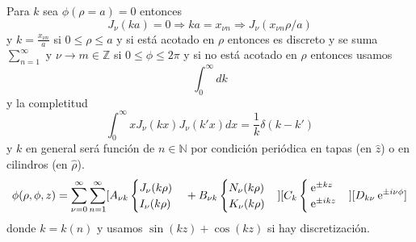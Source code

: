 \documentclass[10pt,oneside]{CBFT_book}
\begin{document}
Para $k$ sea $\phi(\rho=a)=0$ entonces 
\[
	J_\nu(ka) = 0 \Rightarrow ka=x_{\nu n} \Rightarrow J_\nu (x_{\nu n} \rho/a)
\]
y $k=\frac{x_{\nu n}}{a}$ si $0\leq \rho \leq a$ y si está acotado en $\rho$ entonces es discreto y se
suma $\sum_{n=1}^\infty$ y $\nu\to m \in \mathbb{Z}$ si $0 \leq \phi \leq 2\pi$ y si no está acotado en
$\rho$ entonces usamos 
\[
	\int_0^\infty dk
\]
y la completitud
\[
	\int_0^\infty x J_\nu(kx) J_\nu(k'x) dx = \frac{1}{k} \delta (k-k')
\]
y $k$ en general será función de $n\in \mathbb{N}$ por condición periódica en tapas (en $\hat{z}$) o en
cilindros (en $\hat{\rho}$).
\[
	\phi(\rho,\phi,z) = \sum_{\nu=0}^\infty \sum_{n=1}^\infty
	[A_{\nu k}\begin{cases} J_\nu(k\rho)  \\ I_\nu(k\rho) \end{cases} + 
	B_{\nu k} \begin{cases} N_\nu(k\rho)  \\ K_\nu(k\rho) \end{cases} ]
	[C_k \begin{cases} \:\mathrm{e}^{\pm kz} \\ \:\mathrm{e}^{\pm ikz} \end{cases}]
	[D_{k\nu} \:\mathrm{e}^{\pm i \nu \phi}]
\]
donde $k=k(n)$ y usamos $\sin(kz)+\cos(kz)$ si hay discretización.



\end{document}
